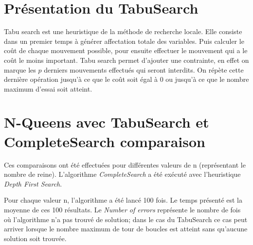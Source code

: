 \documentclass[a4paper,10pt]{article}
\begin{document}
\section{Présentation du TabuSearch}
Tabu search est une heuristique de la méthode de recherche locale. Elle consiste dans un premier temps à générer affectation totale des variables. Puis calculer le coût de chaque mouvement possible, pour ensuite effectuer le mouvement qui a le coût le moins important. Tabu search permet d'ajouter une contrainte, en effet on marque les $p$ derniers mouvements effectués qui seront interdits. On répète cette dernière opération jusqu'à ce que le coût soit égal à 0 ou jusqu'à ce que le nombre maximum d'essai soit atteint.

\section{N-Queens avec TabuSearch et CompleteSearch comparaison}

Ces comparaisons ont été effectuées pour différentes valeurs de n (représentant le nombre de reine). L'algorithme \emph{CompleteSearch} a été exécuté avec l'heuristique \emph{Depth First Search}.

Pour chaque valeur n, l'algorithme a été lancé 100 fois. Le temps présenté est la moyenne de ces 100 résultats. Le \emph{Number of errors} représente le nombre de fois où l'algorithme n'a pas trouvé de solution; dans le cas du TabuSearch ce cas peut arriver lorsque le nombre maximum de tour de boucles est atteint sans qu'aucune solution soit trouvée. \newline
\end{document}
